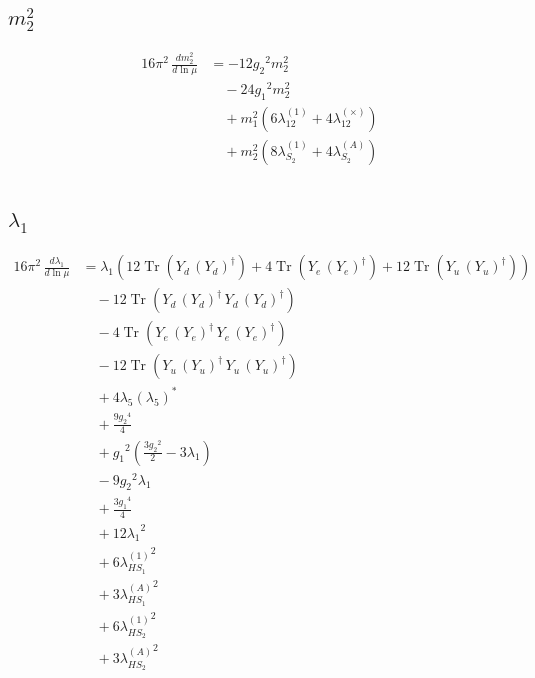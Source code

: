 \documentclass[10pt,a4paper]{article}
\begin{document}
\subsection*{$m_2^2$}
\begin{align*}
16\pi^2\,\frac{d m_2^2}{d\ln\mu} &=-12 {g_2}^2 {m_2^2} \\
&\quad -24 {g_1}^2 {m_2^2} \\
&\quad +{m_1^2} (6 {\lambda_{12}^{(1)}}+4 {\lambda_{12}^{(\times)}}) \\
&\quad +{m_2^2} (8 {\lambda_{S_2}^{(1)}}+4 {\lambda_{S_2}^{(A)}}) \\
\end{align*}
\subsection*{$\lambda_1$}
\begin{align*}
16\pi^2\,\frac{d \lambda_1}{d\ln\mu} &={\lambda_1} (12 \operatorname{Tr}\!\left({Y_d}\,\left({Y_d}\right)^{\dagger}\right)+4 \operatorname{Tr}\!\left({Y_e}\,\left({Y_e}\right)^{\dagger}\right)+12 \operatorname{Tr}\!\left({Y_u}\,\left({Y_u}\right)^{\dagger}\right)) \\
&\quad -12 \operatorname{Tr}\!\left({Y_d}\,\left({Y_d}\right)^{\dagger}\,{Y_d}\,\left({Y_d}\right)^{\dagger}\right) \\
&\quad -4 \operatorname{Tr}\!\left({Y_e}\,\left({Y_e}\right)^{\dagger}\,{Y_e}\,\left({Y_e}\right)^{\dagger}\right) \\
&\quad -12 \operatorname{Tr}\!\left({Y_u}\,\left({Y_u}\right)^{\dagger}\,{Y_u}\,\left({Y_u}\right)^{\dagger}\right) \\
&\quad +4 {\lambda_5} \left({\lambda_5}\right)^{*} \\
&\quad +\frac{9 {g_2}^4}{4} \\
&\quad +{g_1}^2 \left(\frac{3 {g_2}^2}{2}-3 {\lambda_1}\right) \\
&\quad -9 {g_2}^2 {\lambda_1} \\
&\quad +\frac{3 {g_1}^4}{4} \\
&\quad +12 {\lambda_1}^2 \\
&\quad +6 {\lambda_{HS_1}^{(1)}}^2 \\
&\quad +3 {\lambda_{HS_1}^{(A)}}^2 \\
&\quad +6 {\lambda_{HS_2}^{(1)}}^2 \\
&\quad +3 {\lambda_{HS_2}^{(A)}}^2 \\
\end{align*}
\end{document}
